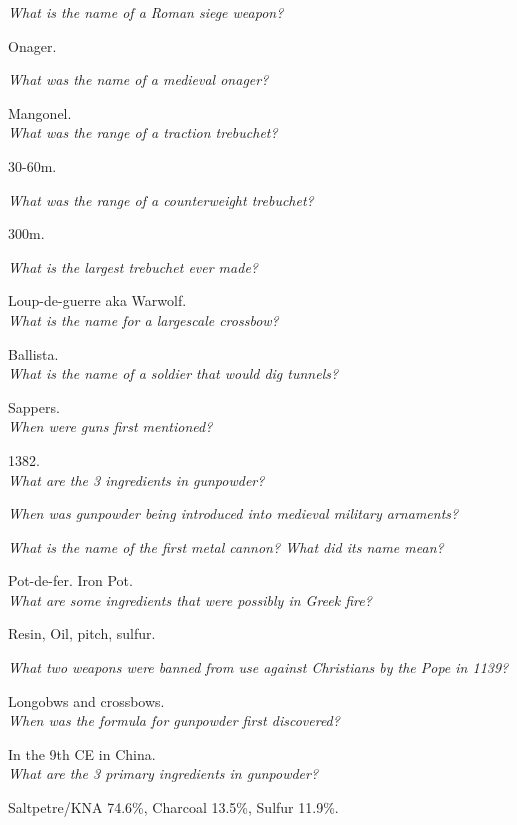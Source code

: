 \documentclass[12pt]{article}
\begin{document}
\textit{What is the name of a Roman siege weapon?}

Onager.

\textit{What was the name of a medieval onager?}

Mangonel.\\

\textit{What was the range of a traction trebuchet?}

30-60m.

\textit{What was the range of a counterweight trebuchet?}

300m.

\textit{What is the largest trebuchet ever made?}

Loup-de-guerre aka Warwolf.\\

\textit{What is the name for a largescale crossbow?}

Ballista.\\

\textit{What is the name of a soldier that would dig tunnels?}

Sappers.\\

\textit{When were guns first mentioned?}

1382.\\

\textit{What are the 3 ingredients in gunpowder?}

\textit{When was gunpowder being introduced into medieval military arnaments?}

\textit{What is the name of the first metal cannon? What did its name mean?}

Pot-de-fer. Iron Pot.\\

\textit{What are some ingredients that were possibly in Greek fire?}

Resin, Oil, pitch, sulfur.

\textit{What two weapons were banned from use against Christians by the Pope in 1139?}

Longobws and crossbows.\\

\textit{When was the formula for gunpowder first discovered?}

In the 9th CE in China.\\

\textit{What are the 3 primary ingredients in gunpowder?}

Saltpetre/KNA 74.6\%, Charcoal 13.5\%, Sulfur 11.9\%.\\
\end{document}
